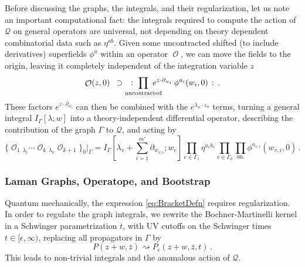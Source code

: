 \documentclass[11pt]{article}
\DeclareMathOperator{\calO}{\mathcal{O}}
\renewcommand{\bm}{\mathcal}
\begin{document}
Before discussing the graphs, the integrals, and their regularization, let us note an important computational fact: the integrals required to compute the action of $\bm{Q}$ on general operators are universal, not depending on theory dependent combinatorial data such as $\eta^{ab}$. Given some uncontracted shifted (to include derivatives) superfields $\phi^a$ within an operator $\calO$, we can move the fields to the origin, leaving it completely independent of the integration variable $z$
\begin{equation}
    \calO(z,0) \,\,\, \supset \quad :\,\,\prod_{\mathclap{\mathrm{uncontracted}}}\,\, e^{z \cdot \partial_{w_i}}\,\phi^{a_i}(w_i,0)\,:\,.
\end{equation}
These factors $e^{z\cdot \partial_{w_i}}$ can then be combined with the $e^{\lambda_n\cdot z_n}$ terms, turning a general integral $I_{\Gamma}[\lambda;w]$ into a theory-independent differential operator, describing the contribution of the graph $\Gamma$ to $\bm{Q}$, and acting by
\begin{equation}\label{eq:IAsDifferentialOperator}
    \{\calO_1 {}_{\lambda_1} \cdots \calO_k {}_{\lambda_k} \calO_{k+1}\}_0\bigg\vert_{\Gamma}
        = I_{\Gamma}[\lambda_v + {\textstyle\sum_{i=1}^{m'}} \partial_{w_{v,i}}; w_e] \prod_{e \in \Gamma_1} \eta^{a_e b_e} \prod_{v \in \Gamma_0} \prod_{{\mathrm{un.}}} \phi^{a_{v,i}}(w_{v,i},0)\,.
\end{equation}


\subsubsection*{Laman Graphs, Operatope, and Bootstrap}
Quantum mechanically, the expression \eqref{eq:BracketDefn} requires regularization. In order to regulate the graph integrals, we rewrite the Bochner-Martinelli kernel in a Schwinger parametrization $t$, with UV cutoffs on the Schwinger times $t \in [\epsilon,\infty)$, replacing all propagators in $\Gamma$ by
\begin{equation}
    P(z+w,\bar{z}) \rightsquigarrow P_\epsilon(z+w,\bar{z},t)\,.
\end{equation}
This leads to non-trivial integrals and the anomalous action of $\bm{Q}$.
\end{document}
